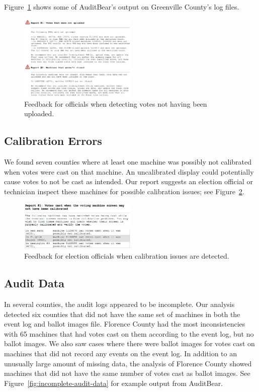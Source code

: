 \documentclass[letterpaper,twocolumn,10pt]{article}
\begin{document}
Figure~\ref{fig:greenville-logs} shows some of AuditBear’s output on Greenville
County’s log files. 

\begin{figure}[htbp]
\begin{center}
    \includegraphics[width=0.5\textwidth,height=0.3\textheight]{VotesNotUploaded.eps}
\end{center}
\caption{Feedback for officials when detecting votes not having been uploaded.}
\label{fig:greenville-logs}
\end{figure}

\subsection{Calibration Errors}
 We found seven counties where at least one machine was possibly not calibrated
when votes were cast on that machine. An uncalibrated display could potentially
cause votes to not be cast as intended. Our report suggests an election official
or technician inspect these machines for possible calibration issues; see
Figure~\ref{fig:calibration-issues}.


\begin{figure}[htbp]
\begin{center}
    \includegraphics[width=0.5\textwidth,height=0.2\textheight]{NotCalibrated.eps}
\end{center}
\caption{Feedback for election officials when calibration issues are detected.}
\label{fig:calibration-issues}
\end{figure}

\subsection{Audit Data}
 In several counties, the audit logs appeared to be incomplete. Our analysis
 detected six counties that did not have the same set of machines in both the
 event log and ballot images file. Florence County had the most inconsistencies
 with 65 machines that had votes cast on them according to the event log, but no
 ballot images. We also saw cases where there were ballot images for votes cast
 on machines that did not record any events on the event log. In addition to an
 unusually large amount of missing data, the analysis of Florence County showed
 machines that did not have the same number of votes cast as ballot images. See
 Figure~\ref{fig:incomplete-audit-data} for example output from AuditBear. 
\end{document}
